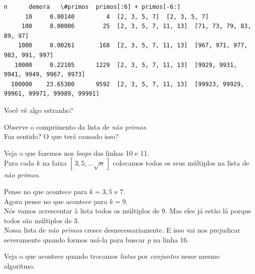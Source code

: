 \documentclass[11pt,a4paper]{article}
\begin{document}
    \begin{Verbatim}[commandchars=\\\{\}]
       n      demora   \#primos  primos[:6] + primos[-6:]
      10     0.00140         4  [2, 3, 5, 7]  [2, 3, 5, 7]
     100     0.00006        25  [2, 3, 5, 7, 11, 13]  [71, 73, 79, 83, 89, 97]
    1000     0.00261       168  [2, 3, 5, 7, 11, 13]  [967, 971, 977, 983, 991, 997]
   10000     0.22105      1229  [2, 3, 5, 7, 11, 13]  [9929, 9931, 9941, 9949, 9967, 9973]
  100000    23.65300      9592  [2, 3, 5, 7, 11, 13]  [99923, 99929, 99961, 99971, 99989, 99991]

    \end{Verbatim}

    Você vê algo estranho?

    Observe o comprimento da lista de \emph{não primos}.\\
Faz sentido? O que terá causado isso?

    Veja o que fazemos nos \emph{loops} das linhas 10 e 11.\\
Para cada \(k\) na faixa \(\left[\,3, 5, \ldots \sqrt{n}\,\right]\)
colocamos todos os seus múltiplos na lista de \emph{não primos}.

Pense no que acontece para \(k = 3, 5\) e \(7\).\\
Agora pense no que acontece para \(k = 9\).\\
Nós vamos acrescentar à lista todos os múltiplos de \(9\). Mas eles já
estão lá porque todos são múltiplos de \(3\).\\
Nossa lista de \emph{não primos} cresce desnecessariamente. E isso vai
nos prejudicar severamente quando formos usá-la para buscar \(p\) na
linha 16.

    Veja o que acontece quando trocamos \emph{listas} por \emph{conjuntos}
nesse mesmo algoritmo.

\pagebreak
\end{document}

